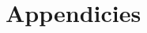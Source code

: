 \documentclass[12pt,oneside]{book}
\begin{document}


\maketitle
\tableofcontents





% 

\mainmatter




\chapter{Appendicies}






\appendix



\backmatter


\end{document}
